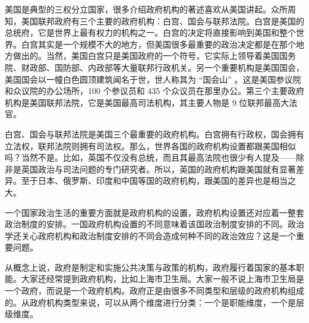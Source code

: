 





美国是典型的三权分立国家，很多介绍政府机构的著述喜欢从美国讲起。众所周知，美国联邦政府有三个主要的政府机构：白宫、国会与联邦法院。白宫是美国的总统府，它是世界上最有权力的机构之一。白宫的决定将直接影响到美国和整个世界。白宫其实是一个规模不大的地方，但美国很多最重要的政治决定都是在那个地方做出的。当然，美国白宫只是美国政府的一个符号，它实际上领导着美国国务院、财政部、国防部、内政部等大量联邦行政机关。另一个重要机构是美国国会，美国国会以一幢白色圆顶建筑闻名于世，世人称其为 “国会山” 。这是美国参议院和众议院的办公场所，100 个参议员和 435 个众议员在那里办公。第三个主要政府机构是美国联邦法院，它是美国最高司法机构，其主要人物是 9 位联邦最高大法官。

白宫、国会与联邦法院是美国三个最重要的政府机构。白宫拥有行政权，国会拥有立法权，联邦法院则拥有司法权。那么，世界各国的政府机构设置都跟美国相似吗？当然不是。比如，英国不仅没有总统，而且其最高法院也很少有人提及——除非是英国政治与司法问题的专门研究者。所以，英国的政府机构跟美国就有显著差异。至于日本、俄罗斯、印度和中国等国的政府机构，跟美国的差异也是相当之大。

一个国家政治生活的重要方面就是政府机构的设置，政府机构设置还对应着一整套政治制度的安排。一国政府机构设置的不同意味着该国政治制度安排的不同。政治学还关心政府机构和政治制度安排的不同会造成何种不同的政治效应？这是一个重要问题。

从概念上说，政府是制定和实施公共决策与政策的机构，政府履行着国家的基本职能。大家还经常提到政府机构，比如上海市卫生局。大家一般不说上海市卫生局是一个政府，而说是一个政府机构。政府正是由很多不同类型和层级的政府机构组成的。从政府机构类型来说，可以从两个维度进行分类：一个是职能维度，一个是层级维度。

